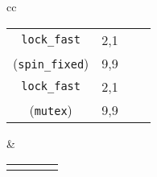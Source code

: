 \begin{table}[t]
\begin{center}
\begin{tabular}{cc}
\begin{tabular}{cc||r|r}
			\hline
			{\tt lock\_fast}
			& 2,1 & \cpu{2.42} & \ints{1}	\\
			({\tt spin\_fixed})
			& 9,9 & \cpu{3.69} & \ints{1}	\\
			\hline
			{\tt lock\_fast}
			& 2,1 & \cpu{2.35} & \ints{1}	\\
			({\tt mutex})
			& 9,9 & \cpu{3.79} & \ints{1}	\\
			\end{tabular}
			&
			\begin{tabular}{cc||r|r}
			& & \cpu{\bf cpu (s)} & \ints{\bf SS size} \\

\end{tabular}
\end{tabular}
\end{center}
\end{table}

